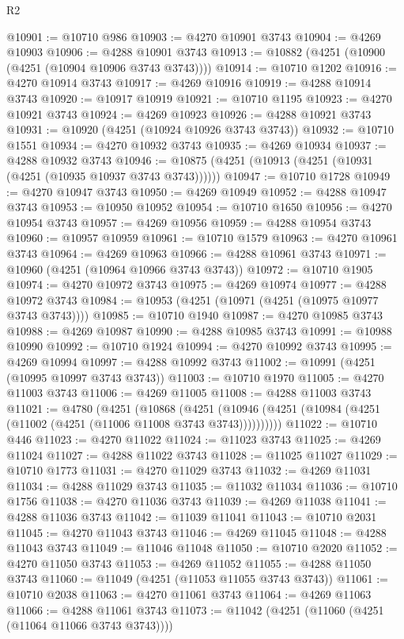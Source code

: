 \begin{lexlean}{R2}
\begin{coremodule}
@10901 := @10710 @986
@10903 := @4270 @10901 @3743
@10904 := @4269 @10903
@10906 := @4288 @10901 @3743
@10913 := @10882 (@4251 (@10900 (@4251 (@10904 @10906 @3743 @3743))))
@10914 := @10710 @1202
@10916 := @4270 @10914 @3743
@10917 := @4269 @10916
@10919 := @4288 @10914 @3743
@10920 := @10917 @10919
@10921 := @10710 @1195
@10923 := @4270 @10921 @3743
@10924 := @4269 @10923
@10926 := @4288 @10921 @3743
@10931 := @10920 (@4251 (@10924 @10926 @3743 @3743))
@10932 := @10710 @1551
@10934 := @4270 @10932 @3743
@10935 := @4269 @10934
@10937 := @4288 @10932 @3743
@10946 := @10875 (@4251 (@10913 (@4251 (@10931 (@4251 (@10935 @10937 @3743 @3743))))))
@10947 := @10710 @1728
@10949 := @4270 @10947 @3743
@10950 := @4269 @10949
@10952 := @4288 @10947 @3743
@10953 := @10950 @10952
@10954 := @10710 @1650
@10956 := @4270 @10954 @3743
@10957 := @4269 @10956
@10959 := @4288 @10954 @3743
@10960 := @10957 @10959
@10961 := @10710 @1579
@10963 := @4270 @10961 @3743
@10964 := @4269 @10963
@10966 := @4288 @10961 @3743
@10971 := @10960 (@4251 (@10964 @10966 @3743 @3743))
@10972 := @10710 @1905
@10974 := @4270 @10972 @3743
@10975 := @4269 @10974
@10977 := @4288 @10972 @3743
@10984 := @10953 (@4251 (@10971 (@4251 (@10975 @10977 @3743 @3743))))
@10985 := @10710 @1940
@10987 := @4270 @10985 @3743
@10988 := @4269 @10987
@10990 := @4288 @10985 @3743
@10991 := @10988 @10990
@10992 := @10710 @1924
@10994 := @4270 @10992 @3743
@10995 := @4269 @10994
@10997 := @4288 @10992 @3743
@11002 := @10991 (@4251 (@10995 @10997 @3743 @3743))
@11003 := @10710 @1970
@11005 := @4270 @11003 @3743
@11006 := @4269 @11005
@11008 := @4288 @11003 @3743
@11021 := @4780
    (@4251
      (@10868
        (@4251 (@10946 (@4251 (@10984 (@4251 (@11002 (@4251 (@11006 @11008 @3743 @3743))))))))))
@11022 := @10710 @446
@11023 := @4270 @11022
@11024 := @11023 @3743
@11025 := @4269 @11024
@11027 := @4288 @11022 @3743
@11028 := @11025 @11027
@11029 := @10710 @1773
@11031 := @4270 @11029 @3743
@11032 := @4269 @11031
@11034 := @4288 @11029 @3743
@11035 := @11032 @11034
@11036 := @10710 @1756
@11038 := @4270 @11036 @3743
@11039 := @4269 @11038
@11041 := @4288 @11036 @3743
@11042 := @11039 @11041
@11043 := @10710 @2031
@11045 := @4270 @11043 @3743
@11046 := @4269 @11045
@11048 := @4288 @11043 @3743
@11049 := @11046 @11048
@11050 := @10710 @2020
@11052 := @4270 @11050 @3743
@11053 := @4269 @11052
@11055 := @4288 @11050 @3743
@11060 := @11049 (@4251 (@11053 @11055 @3743 @3743))
@11061 := @10710 @2038
@11063 := @4270 @11061 @3743
@11064 := @4269 @11063
@11066 := @4288 @11061 @3743
@11073 := @11042 (@4251 (@11060 (@4251 (@11064 @11066 @3743 @3743))))

\end{coremodule}
\end{lexlean}
